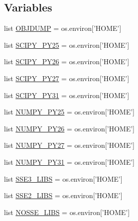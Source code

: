 \subsection*{Variables}
\begin{DoxyCompactItemize}
\item 
list \hyperlink{namespacedetect__cpu__extensions__wine_a26fdeb16a7d4d98d8ac4ced5199f34ea}{O\+B\+J\+D\+U\+M\+P} = os.\+environ\mbox{[}'H\+O\+M\+E'\mbox{]}
\item 
list \hyperlink{namespacedetect__cpu__extensions__wine_a0168f4813409c24764be2008668f68eb}{S\+C\+I\+P\+Y\+\_\+\+P\+Y25} = os.\+environ\mbox{[}'H\+O\+M\+E'\mbox{]}
\item 
list \hyperlink{namespacedetect__cpu__extensions__wine_a879d92d57a8d08dec8dbefb70121db49}{S\+C\+I\+P\+Y\+\_\+\+P\+Y26} = os.\+environ\mbox{[}'H\+O\+M\+E'\mbox{]}
\item 
list \hyperlink{namespacedetect__cpu__extensions__wine_a06b099280fc1e4f503a01c7d65722537}{S\+C\+I\+P\+Y\+\_\+\+P\+Y27} = os.\+environ\mbox{[}'H\+O\+M\+E'\mbox{]}
\item 
list \hyperlink{namespacedetect__cpu__extensions__wine_a317ad0a9c658b7b68322412ae2e10cc0}{S\+C\+I\+P\+Y\+\_\+\+P\+Y31} = os.\+environ\mbox{[}'H\+O\+M\+E'\mbox{]}
\item 
list \hyperlink{namespacedetect__cpu__extensions__wine_aa98261a166baf5d485379c9b6fac1bc2}{N\+U\+M\+P\+Y\+\_\+\+P\+Y25} = os.\+environ\mbox{[}'H\+O\+M\+E'\mbox{]}
\item 
list \hyperlink{namespacedetect__cpu__extensions__wine_afd02a2590f60c174a6c9e912fcfe3633}{N\+U\+M\+P\+Y\+\_\+\+P\+Y26} = os.\+environ\mbox{[}'H\+O\+M\+E'\mbox{]}
\item 
list \hyperlink{namespacedetect__cpu__extensions__wine_af15c68df14746067260d15d556668d8d}{N\+U\+M\+P\+Y\+\_\+\+P\+Y27} = os.\+environ\mbox{[}'H\+O\+M\+E'\mbox{]}
\item 
list \hyperlink{namespacedetect__cpu__extensions__wine_a0957b014d0b738b2678608aadf62317d}{N\+U\+M\+P\+Y\+\_\+\+P\+Y31} = os.\+environ\mbox{[}'H\+O\+M\+E'\mbox{]}
\item 
list \hyperlink{namespacedetect__cpu__extensions__wine_ae97f704d3bf0ed4d08bad685663ee6e2}{S\+S\+E3\+\_\+\+L\+I\+B\+S} = os.\+environ\mbox{[}'H\+O\+M\+E'\mbox{]}
\item 
list \hyperlink{namespacedetect__cpu__extensions__wine_aa827c44f0460e12f7b01b317c173313b}{S\+S\+E2\+\_\+\+L\+I\+B\+S} = os.\+environ\mbox{[}'H\+O\+M\+E'\mbox{]}
\item 
list \hyperlink{namespacedetect__cpu__extensions__wine_af518e0c91e47c5e49e1ca112f2d57620}{N\+O\+S\+S\+E\+\_\+\+L\+I\+B\+S} = os.\+environ\mbox{[}'H\+O\+M\+E'\mbox{]}

\end{DoxyCompactItemize}
